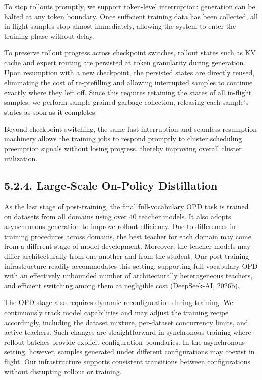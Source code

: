 \documentclass[
  10
]{article}
\begin{document}
To stop rollouts promptly, we support token-level interruption:
generation can be halted at any token boundary. Once sufficient training
data has been collected, all in-flight samples stop almost immediately,
allowing the system to enter the training phase without delay.

To preserve rollout progress across checkpoint switches, rollout states
such as KV cache and expert routing are persisted at token granularity
during generation. Upon resumption with a new checkpoint, the persisted
states are directly reused, eliminating the cost of re-prefilling and
allowing interrupted samples to continue exactly where they left off.
Since this requires retaining the states of all in-flight samples, we
perform sample-grained garbage collection, releasing each sample's
states as soon as it completes.

Beyond checkpoint switching, the same fast-interruption and
seamless-resumption machinery allows the training jobs to respond
promptly to cluster scheduling preemption signals without losing
progress, thereby improving overall cluster utilization.

\subsection{5.2.4. Large-Scale On-Policy
Distillation}\label{large-scale-on-policy-distillation}

As the last stage of post-training, the final full-vocabulary OPD task
is trained on datasets from all domains using over 40 teacher models. It
also adopts asynchronous generation to improve rollout efficiency. Due
to differences in training procedures across domains, the best teacher
for each domain may come from a different stage of model development.
Moreover, the teacher models may differ architecturally from one another
and from the student. Our post-training infrastructure readily
accommodates this setting, supporting full-vocabulary OPD with an
effectively unbounded number of architecturally heterogeneous teachers,
and efficient switching among them at negligible cost (DeepSeek-AI,
2026b).

The OPD stage also requires dynamic reconfiguration during training. We
continuously track model capabilities and may adjust the training recipe
accordingly, including the dataset mixture, per-dataset concurrency
limits, and active teachers. Such changes are straightforward in
synchronous training where rollout batches provide explicit
configuration boundaries. In the asynchronous setting, however, samples
generated under different configurations may coexist in flight. Our
infrastructure supports consistent transitions between configurations
without disrupting rollout or training.
\end{document}
